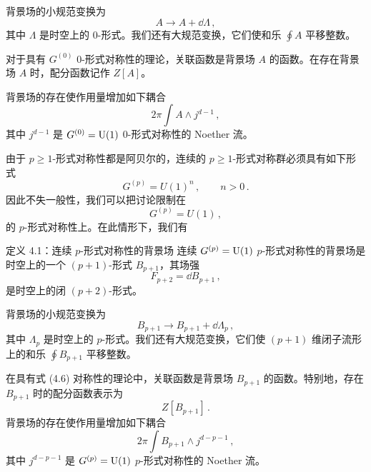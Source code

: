 背景场的小规范变换为
\begin{equation}
  A\to A+\dd\Lambda\,, \tag{4.3}
\end{equation}
其中 $\Lambda$ 是时空上的 0-形式。我们还有大规范变换，它们使和乐 $\oint A$ 平移整数。

对于具有 $G^{(0)}$ 0-形式对称性的理论，关联函数是背景场 $A$ 的函数。在存在背景场 $A$ 时，配分函数记作 $Z[A]$。

背景场的存在使作用量增加如下耦合
\begin{equation}
  2\pi\int A\wedge j^{d-1}\,, \tag{4.4}
\end{equation}
其中 $j^{d-1}$ 是 $G^{(0)}=\mathrm{U}(1)$ 0-形式对称性的 Noether 流。


 由于 $p\ge1$-形式对称性都是阿贝尔的，连续的 $p\ge1$-形式对称群必须具有如下形式
\begin{equation}
  G^{(p)}=U(1)^n\,,\qquad n>0\,. \tag{4.5}
\end{equation}
因此不失一般性，我们可以把讨论限制在
\begin{equation}
  G^{(p)}=U(1)\,, \tag{4.6}
\end{equation}
的 $p$-形式对称性上。在此情形下，我们有

\begin{definitionbox}{定义 4.1：连续 $p$-形式对称性的背景场}
连续 $G^{(p)}=\mathrm{U}(1)$ $p$-形式对称性的背景场是时空上的一个 $(p+1)$-形式 $B_{p+1}$，其场强
\begin{equation}
  F_{p+2}=\dd B_{p+1}\,, \tag{4.7}
\end{equation}
是时空上的闭 $(p+2)$-形式。
\end{definitionbox}

背景场的小规范变换为
\begin{equation}
  B_{p+1}\to B_{p+1}+\dd\Lambda_p\,, \tag{4.8}
\end{equation}
其中 $\Lambda_p$ 是时空上的 $p$-形式。我们还有大规范变换，它们使 $(p+1)$ 维闭子流形上的和乐 $\oint B_{p+1}$ 平移整数。

在具有式 (4.6) 对称性的理论中，关联函数是背景场 $B_{p+1}$ 的函数。特别地，存在 $B_{p+1}$ 时的配分函数表示为
\begin{equation}
  Z[B_{p+1}]\,. \tag{4.9}
\end{equation}
背景场的存在使作用量增加如下耦合
\begin{equation}
  2\pi\int B_{p+1}\wedge j^{d-p-1}\,, \tag{4.10}
\end{equation}
其中 $j^{d-p-1}$ 是 $G^{(p)}=\mathrm{U}(1)$ $p$-形式对称性的 Noether 流。

